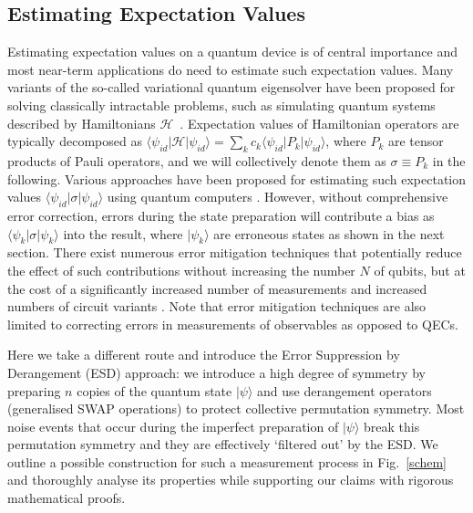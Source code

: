 \documentclass[aps,prx,showpacs,twocolumn,reprint]{revtex4-2}
\begin{document}
\subsection{Estimating Expectation Values}

 
Estimating expectation values on a quantum device is of central
importance and most near-term applications do need to estimate
such expectation values.
Many variants of the so-called variational quantum eigensolver have
been proposed for solving classically intractable problems, such as
simulating quantum systems described by
Hamiltonians $\mathcal{H}$~\cite{cerezo2020variationalreview, endo2020hybrid,bharti2021noisy,farhi2014quantum,peruzzo2014variational,wang2015quantum,PRXH2,PhysRevA.95.020501,mcclean2016theory,
	PhysRevLett.118.100503,Li2017,PhysRevX.8.011021,Santagatieaap9646,kandala2017hardware,kandala2018extending,
	PhysRevX.8.031022,romero2018strategies,higgott2018variational,mcclean2017hybrid,colless2017robust,kokail2019self,sharma2020noise, koczor2019variational, koczor2019quantum, koczor2020quantumAnalytic}.
Expectation values of Hamiltonian operators are typically decomposed
as $\langle\psi_{id} | \mathcal{H} | \psi_{id} \rangle = \sum_k c_k \langle\psi_{id} | P_k | \psi_{id} \rangle$,
where $P_k$ are tensor products of Pauli operators, and we will collectively denote them as
$\sigma \equiv P_k$ in the following.
Various approaches have been proposed for estimating such
expectation values $\langle\psi_{id} | \sigma | \psi_{id} \rangle$ 
using quantum computers \cite{endo2020hybrid,Li2017,XYuan2019,Crawford2019,hadfield2020measurements}.
However, without comprehensive error correction, errors during the state preparation
will contribute a bias as  $\langle\psi_k | \sigma | \psi_k \rangle$ into the result,
where $| \psi_k \rangle$ are erroneous states as shown
in the next section. There exist numerous error mitigation techniques that
potentially reduce the effect of such contributions without increasing the number $N$
of qubits, but at the cost of a significantly increased number of measurements and increased numbers
of circuit variants \cite{endo2020hybrid,Li2017,PhysRevX.8.031027, kandala2018extending,PhysRevLett.119.180509, strikis2020learning, czarnik2020error, PhysRevLett.122.180501}. Note that error mitigation techniques are also limited to
correcting errors in measurements of observables as opposed to QECs.


Here we take a different route and introduce the Error Suppression by Derangement (ESD) approach:
we introduce a high degree of symmetry by preparing $n$ copies of the quantum state
$|\psi \rangle$ and use derangement operators (generalised SWAP operations) to protect collective permutation symmetry.
Most noise events that occur during the imperfect preparation of $|\psi\rangle$ break this permutation symmetry and
they are effectively `filtered out' by the ESD.
We outline a possible construction for such a measurement process in Fig.~\ref{schem}
and thoroughly analyse its properties while supporting our claims with rigorous mathematical proofs.
\end{document}
